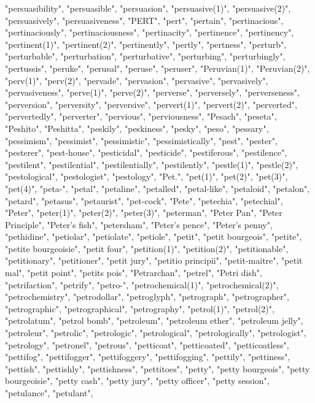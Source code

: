 "persuasibility",
"persuasible",
"persuasion",
"persuasive(1)",
"persuasive(2)",
"persuasively",
"persuasiveness",
"PERT",
"pert",
"pertain",
"pertinacious",
"pertinaciously",
"pertinaciousness",
"pertinacity",
"pertinence",
"pertinency",
"pertinent(1)",
"pertinent(2)",
"pertinently",
"pertly",
"pertness",
"perturb",
"perturbable",
"perturbation",
"perturbative",
"perturbing",
"perturbingly",
"pertussis",
"peruke",
"perusal",
"peruse",
"peruser",
"Peruvian(1)",
"Peruvian(2)",
"perv(1)",
"perv(2)",
"pervade",
"pervasion",
"pervasive",
"pervasively",
"pervasiveness",
"perve(1)",
"perve(2)",
"perverse",
"perversely",
"perverseness",
"perversion",
"perversity",
"perversive",
"pervert(1)",
"pervert(2)",
"perverted",
"pervertedly",
"perverter",
"pervious",
"perviousness",
"Pesach",
"peseta",
"Peshito",
"Peshitta",
"peskily",
"peskiness",
"pesky",
"peso",
"pessary",
"pessimism",
"pessimist",
"pessimistic",
"pessimistically",
"pest",
"pester",
"pesterer",
"pest-house",
"pesticidal",
"pesticide",
"pestiferous",
"pestilence",
"pestilent",
"pestilential",
"pestilentially",
"pestilently",
"pestle(1)",
"pestle(2)",
"pestological",
"pestologist",
"pestology",
"Pet.",
"pet(1)",
"pet(2)",
"pet(3)",
"pet(4)",
"peta-",
"petal",
"petaline",
"petalled",
"petal-like",
"petaloid",
"petalon",
"petard",
"petasus",
"petaurist",
"pet-cock",
"Pete",
"petechia",
"petechial",
"Peter",
"peter(1)",
"peter(2)",
"peter(3)",
"peterman",
"Peter Pan",
"Peter Principle",
"Peter's fish",
"petersham",
"Peter's pence",
"Peter's penny",
"pethidine",
"petiolar",
"petiolate",
"petiole",
"petit",
"petit bourgeois",
"petite",
"petite bourgeoisie",
"petit four",
"petition(1)",
"petition(2)",
"petitionable",
"petitionary",
"petitioner",
"petit jury",
"petitio principii",
"petit-maitre",
"petit mal",
"petit point",
"petits pois",
"Petrarchan",
"petrel",
"Petri dish",
"petrifaction",
"petrify",
"petro-",
"petrochemical(1)",
"petrochemical(2)",
"petrochemistry",
"petrodollar",
"petroglyph",
"petrograph",
"petrographer",
"petrographic",
"petrographical",
"petrography",
"petrol(1)",
"petrol(2)",
"petrolatum",
"petrol bomb",
"petroleum",
"petroleum ether",
"petroleum jelly",
"petroleur",
"petrolic",
"petrologic",
"petrological",
"petrologically",
"petrologist",
"petrology",
"petronel",
"petrous",
"petticoat",
"petticoated",
"petticoatless",
"pettifog",
"pettifogger",
"pettifoggery",
"pettifogging",
"pettily",
"pettiness",
"pettish",
"pettishly",
"pettishness",
"pettitoes",
"petty",
"petty bourgeois",
"petty bourgeoisie",
"petty cash",
"petty jury",
"petty officer",
"petty session",
"petulance",
"petulant",
